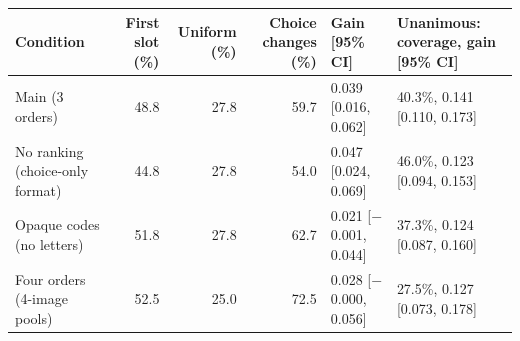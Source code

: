 \scriptsize
\begin{tabular*}{\textwidth}{@{\extracolsep{\fill}}lrrrll}
\toprule
Condition & First slot (\%) & Uniform (\%) & Choice changes (\%) & Gain [95\% CI] & Unanimous: coverage, gain [95\% CI]\\
\midrule
Main (3 orders) & 48.8 & 27.8 & 59.7 & 0.039 [0.016, 0.062] & 40.3\%, 0.141 [0.110, 0.173]\\
No ranking (choice-only format) & 44.8 & 27.8 & 54.0 & 0.047 [0.024, 0.069] & 46.0\%, 0.123 [0.094, 0.153]\\
Opaque codes (no letters) & 51.8 & 27.8 & 62.7 & 0.021 [$-$0.001, 0.044] & 37.3\%, 0.124 [0.087, 0.160]\\
Four orders (4-image pools) & 52.5 & 25.0 & 72.5 & 0.028 [$-$0.000, 0.056] & 27.5\%, 0.127 [0.073, 0.178]\\
\bottomrule
\end{tabular*}

